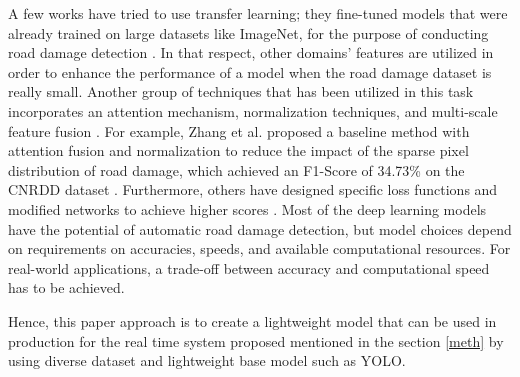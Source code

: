 A few works have tried to use transfer learning; they fine-tuned models that were already trained on large datasets like ImageNet, for the purpose of conducting road damage detection \cite{ Arya2021, Samma2021}. In that respect, other domains' features are utilized in order to enhance the performance of a model when the road damage dataset is really small. Another group of techniques that has been utilized in this task incorporates an attention mechanism, normalization techniques, and multi-scale feature fusion \cite{ Ha2022, Zhang2022}. For example, Zhang et al.  proposed a baseline method with attention fusion and normalization to reduce the impact of the sparse pixel distribution of road damage, which achieved an F1-Score of 34.73\% on the CNRDD dataset \cite{ Zhang2022}. Furthermore, others have designed specific loss functions and modified networks to achieve higher scores \cite{Silva2023}. Most of the deep learning models have the potential of automatic road damage detection, but model choices depend on requirements on accuracies, speeds, and available computational resources. For real-world applications, a trade-off between accuracy and computational speed has to be achieved.

Hence, this paper approach is to create a lightweight model that can be used in production for the real time system proposed mentioned in the section \ref{meth} by using diverse dataset and lightweight base model such as YOLO. 












